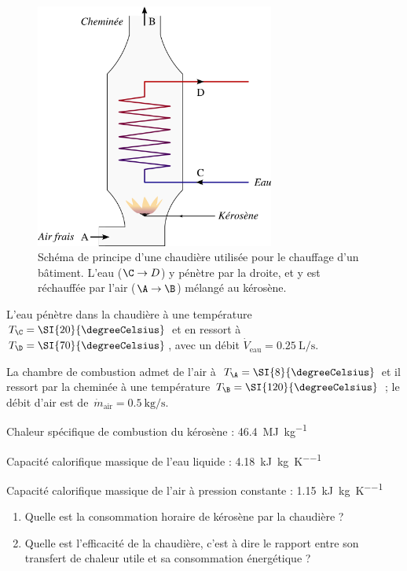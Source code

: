 	\begin{figure}
		\begin{center}
			\includegraphics[width=0.7\textwidth]{images/chaudiere_eau.png}
		\end{center}
		\caption{Schéma de principe d’une chaudière utilisée pour le chauffage d’un bâtiment. L’eau ($\C \to D$) y pénètre par la droite, et y est réchauffée par l’air ($\A \to \B$) mélangé au kérosène.}
		\label{fig_chaudiere_eau}
	\end{figure}
	
	L’eau pénètre dans la chaudière à une température $T_\C = \SI{20}{\degreeCelsius}$ et en ressort à $T_\D = \SI{70}{\degreeCelsius}$, avec un débit $\dot V_{\text{eau}} = \SI{0,25}{\liter\per\second}$.
	
	La chambre de combustion admet de l’air à~$T_\A = \SI{8}{\degreeCelsius}$ et il ressort par la cheminée à une température $T_\B = \SI{120}{\degreeCelsius}$ ; le débit d’air est de~$\dot m_{\text{air}} = \SI{0,5}{\kilogram\per\second}$.
	
	\TabPositions{11cm}
	Chaleur spécifique de combustion du kérosène  : 			\tab \SI{46,4}{\mega\joule\per\kilogram}
	
	Capacité calorifique massique de l’eau liquide  : 			\tab \SI{4,18}{\kilo\joule\per\kilogram\per\kelvin}
	
	Capacité calorifique massique de l’air à pression constante  : 	\tab \SI{1,15}{\kilo\joule\per\kilogram\per\kelvin}
	\TabPositions{6cm} %

	\begin{enumerate}
	\item Quelle est la consommation horaire de kérosène par la chaudière ?
	\item Quelle est l’efficacité de la chaudière, c’est à dire le rapport entre son transfert de chaleur utile et sa consommation énergétique ?
	\end{enumerate}


